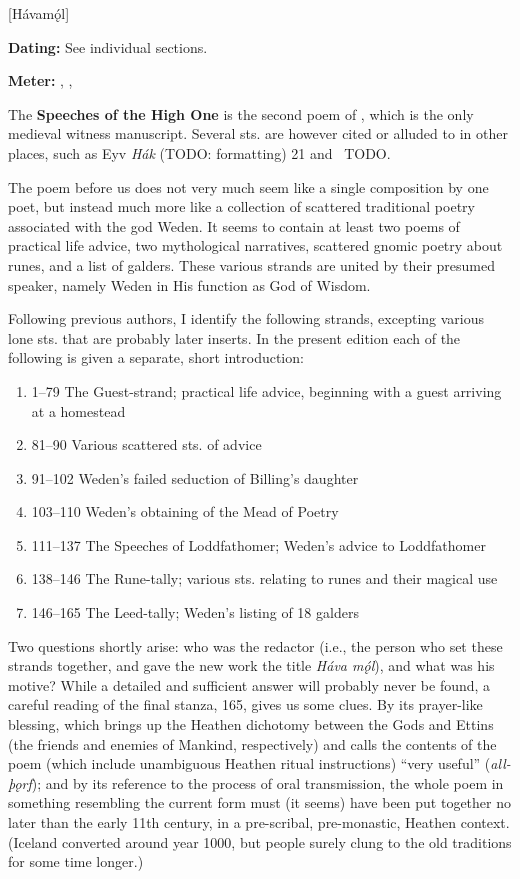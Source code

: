 [Hávamǫ́l]

\begin{flushright}%
\textbf{Dating:} See individual sections.

\textbf{Meter:} \Ljodahattr, \Galdralag, \Fornyrdislag%
\end{flushright}%


The \textbf{Speeches of the High One} is the second poem of \Regius, which is the only medieval witness manuscript.  Several sts. are however cited or alluded to in other places, such as Eyv \emph{Hák} (TODO: formatting) 21 and \FostrbroedhraSaga\ TODO.

The poem before us does not very much seem like a single composition by one poet, but instead much more like a collection of scattered traditional poetry associated with the god Weden.  It seems to contain at least two poems of practical life advice, two mythological narratives, scattered gnomic poetry about runes, and a list of galders.  These various strands are united by their presumed speaker, namely Weden in His function as God of Wisdom.

Following previous authors, I identify the following strands, excepting various lone sts. that are probably later inserts.  In the present edition each of the following is given a separate, short introduction:

\begin{enumerate}
	\item 1–79 The Guest-strand; practical life advice, beginning with a guest arriving at a homestead
  \item 81–90 Various scattered sts. of advice
  \item 91–102 Weden’s failed seduction of Billing’s daughter
  \item 103–110 Weden’s obtaining of the Mead of Poetry
  \item 111–137 The Speeches of Loddfathomer; Weden’s advice to Loddfathomer
  \item 138–146 The Rune-tally; various sts. relating to runes and their magical use
  \item 146–165 The Leed-tally; Weden’s listing of 18 galders
\end{enumerate}

Two questions shortly arise: who was the redactor (i.e., the person who set these strands together, and gave the new work the title \emph{Háva mǫ́l}), and what was his motive?  While a detailed and sufficient answer will probably never be found, a careful reading of the final stanza, 165, gives us some clues.  By its prayer-like blessing, which brings up the Heathen dichotomy between the Gods and Ettins (the friends and enemies of Mankind, respectively) and calls the contents of the poem (which include unambiguous Heathen ritual instructions) “very useful” (\emph{all-þǫrf}); and by its reference to the process of oral transmission, the whole poem in something resembling the current form must (it seems) have been put together no later than the early 11th century, in a pre-scribal, pre-monastic, Heathen context. (Iceland converted around year 1000, but people surely clung to the old traditions for some time longer.)

